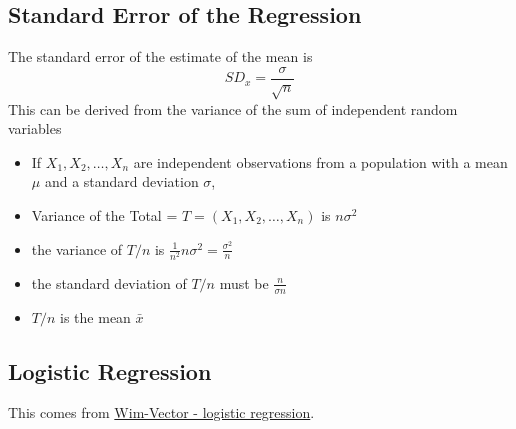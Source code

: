 \documentclass[12pt, a4paper, oneside]{article}\usepackage[]{graphicx}\usepackage[]{color}
\begin{document}
\subsection{Standard Error of the Regression}
The standard error of the estimate of the mean is 
\begin{equation}
SD_x = \frac{\sigma}{\sqrt{n}}
\end{equation}
This can be derived from the variance of the sum of independent random variables
\begin{itemize}
\item If $X_1, X_2, \dots, X_n$ are independent observations from a population with a mean $\mu$ and a standard deviation $\sigma$, 
\item Variance of the Total = $T = (X_1, X_2, \dots, X_n)$ is $n\sigma^2$
\item the variance of $T/n$ is $\frac{1}{n^2}n\sigma^2 = \frac{\sigma^2}{n}$
\item the standard deviation of $T/n$ must be $\frac{n}{\sigma n}$
\item $T/n$ is the mean $\bar{x}$
\end{itemize}

\subsection{Logistic Regression}
This comes from \href{http://www.win-vector.com/blog/2010/11/learn-a-powerful-machine-learning-tool-logistic-regression-and-beyond/}{Wim-Vector - logistic regression}.  
\end{document}
